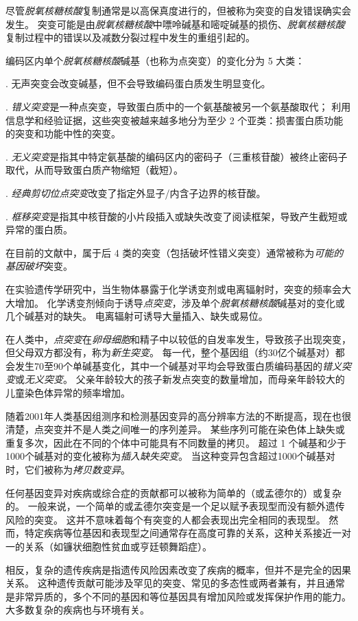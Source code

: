 \begin{proposition}[突变：遗传多样性的起源] \label{box:2_1}
	
	\quad \quad 尽管\textit{脱氧核糖核酸}复制通常是以高保真度进行的，但被称为突变的自发错误确实会发生。
	突变可能是由\textit{脱氧核糖核酸}中嘌呤碱基和嘧啶碱基的损伤、\textit{脱氧核糖核酸}复制过程中的错误以及减数分裂过程中发生的重组引起的。
	
	
	\quad \quad 编码区内单个\textit{脱氧核糖核酸}碱基（也称为点突变）的变化分为 5 大类：
	
	
	\quad {}. 无声突变会改变碱基，但不会导致编码蛋白质发生明显变化。
	
	
	\quad {}. \textit{错义突变}是一种点突变，导致蛋白质中的一个氨基酸被另一个氨基酸取代；
	利用信息学和经验证据，这些突变被越来越多地分为至少 2 个亚类：损害蛋白质功能的突变和功能中性的突变。
	
	
	\quad {}. \textit{无义突变}是指其中特定氨基酸的编码区内的密码子（三重核苷酸）被终止密码子取代，从而导致蛋白质产物缩短（截短）。
	
	
	\quad {}. \textit{经典剪切位点突变}改变了指定外显子/内含子边界的核苷酸。
	
	\quad {}. \textit{框移突变}是指其中核苷酸的小片段插入或缺失改变了阅读框架，导致产生截短或异常的蛋白质。
	
	\quad \quad 在目前的文献中，属于后 4 类的突变（包括破坏性错义突变）通常被称为\textit{可能的基因破坏}突变。
	
	\quad \quad 在实验遗传学研究中，当生物体暴露于化学诱变剂或电离辐射时，突变的频率会大大增加。
	化学诱变剂倾向于诱导\textit{点突变}，涉及单个\textit{脱氧核糖核酸}碱基对的变化或几个碱基对的缺失。
	电离辐射可诱导大量插入、缺失或易位。
	
	\quad \quad 在人类中，\textit{点突变}在\textit{卵母细胞}和精子中以较低的自发率发生，导致孩子出现突变，但父母双方都没有，称为\textit{新生突变}。
	每一代，整个基因组（约30亿个碱基对）都会发生70至90个单碱基变化，其中一个碱基对平均会导致蛋白质编码基因的\textit{错义突变}或\textit{无义突变}。
	父亲年龄较大的孩子新发点突变的数量增加，而母亲年龄较大的儿童染色体异常的频率增加。
	
	
	\quad \quad 随着2001年人类基因组测序和检测基因变异的高分辨率方法的不断提高，现在也很清楚，点突变并不是人类之间唯一的序列差异。
	某些序列可能在染色体上缺失或重复多次，因此在不同的个体中可能具有不同数量的拷贝。
	超过 1 个碱基和少于1000个碱基对的变化被称为\textit{插入缺失突变}。
	当这种变异包含超过1000个碱基对时，它们被称为\textit{拷贝数变异}。
	
	
	\quad \quad 任何基因变异对疾病或综合症的贡献都可以被称为简单的（或孟德尔的）或复杂的。
	一般来说，一个简单的或孟德尔突变是一个足以赋予表现型而没有额外遗传风险的突变。
	这并不意味着每个有突变的人都会表现出完全相同的表现型。
	然而，特定疾病等位基因和表现型之间通常存在高度可靠的关系，这种关系接近一对一的关系（如镰状细胞性贫血或亨廷顿舞蹈症）。
	
	
	\quad \quad 相反，复杂的遗传疾病是指遗传风险因素改变了疾病的概率，但并不是完全的因果关系。
	这种遗传贡献可能涉及罕见的突变、常见的多态性或两者兼有，并且通常是非常异质的，多个不同的基因和等位基因具有增加风险或发挥保护作用的能力。
	大多数复杂的疾病也与环境有关。
	
		
\end{proposition}
